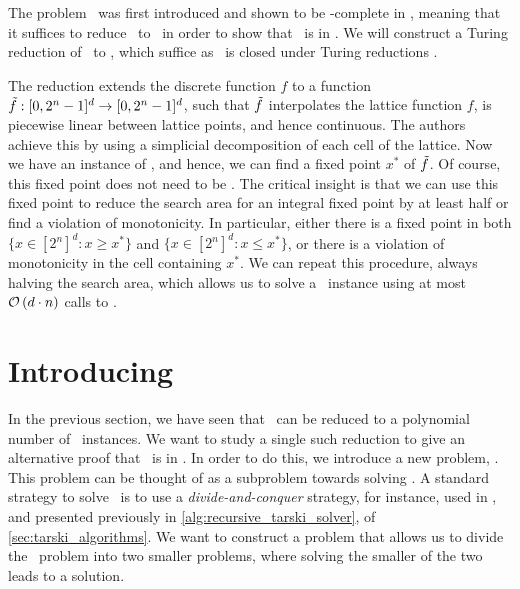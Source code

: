 
The problem \Brouwer\ was first introduced and shown to be \PPAD-complete in , meaning that it suffices to reduce \Tarski\ to \Brouwer\ in order to show that \Tarski\ is in \PPAD. We will construct a Turing reduction of \Tarski\ to \Brouwer, which suffice as \PPAD\ is closed under Turing reductions .

The reduction extends the discrete function $f$ to a function $\Tilde{f} : [0, 2^n - 1]^d \rightarrow [0, 2^n - 1]^d$, such that $\Tilde{f}$ interpolates the lattice function $f$, is piecewise linear between lattice points, and hence continuous. The authors achieve this by using a simplicial decomposition of each cell of the lattice. Now we have an instance of \Brouwer, and hence, we can find a fixed point $x^*$ of $\Tilde{f}$. Of course, this fixed point does not need to be .
The critical insight is that we can use this fixed point to reduce the search area for an integral fixed point by at least half or find a violation of monotonicity. In particular, either there is a fixed point in both $\{x \in [2^n]^d : x \geq x^*\}$ and $\{x \in [2^n]^d : x \leq x^*\}$, or there is a violation of monotonicity in the cell containing $x^*$.
We can repeat this procedure, always halving the search area, which allows us to solve a \Tarski\ instance using at most $\mathcal{O}\left(d \cdot n\right)$ calls to \Brouwer.

\section{Introducing \Tarskistar}
\label{sec:introducing_tarskistar}

In the previous section, we have seen that \Tarski\ can be reduced to a polynomial number of \Brouwer\ instances. We want to study a single such reduction to give an alternative proof that \Tarski\ is in \PPAD. In order to do this, we introduce a new problem, \Tarskistar. This problem can be thought of as a subproblem towards solving \Tarski. A standard strategy to solve \Tarski\ is to use a \emph{divide-and-conquer} strategy, for instance, used in , and presented previously in \cref{alg:recursive_tarski_solver}, of \cref{sec:tarski_algorithms}. We want to construct a problem that allows us to divide the \Tarski\ problem into two smaller problems, where solving the smaller of the two leads to a solution.

